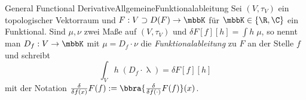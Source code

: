 \begin{mdef}{General Functional Derivative}{AllgemeineFunktionalableitung}
    Sei $(V,\tau_V)$ ein topologischer Vektorraum und $F:V\supset D(F)\to \mbbK$ für $\mbbK\in\{\R,\C\}$ ein Funktional. Sind $\mu,\nu$ zwei Maße auf $(V,\tau_V)$ und $\delta F[f][h] = \int h\;\mu$, so nennt man $D_f:V\to\mbbK$ mit $\mu = D_f\cdot \nu$ die \emph{Funktionalableitung} zu $F$ an der Stelle $f$ und schreibt
    \[
        \int_{V}h\;(D_f\cdot\uplambda) = \delta F[f][h]
    \] 
    mit der Notation $\frac{\delta}{\delta f(x)}F(f):=\bbra{\frac{\delta}{\delta f(\cdot)}F(f)}(x)$.
\end{mdef}